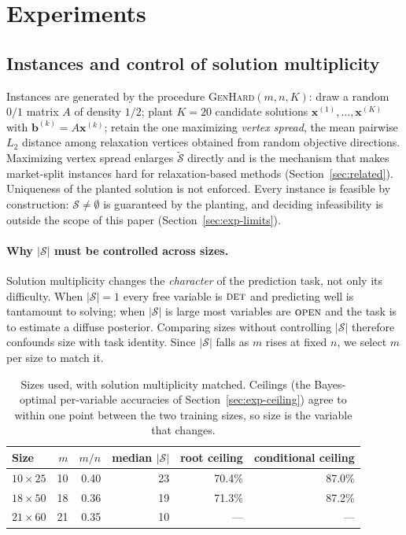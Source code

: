 \documentclass[preprint,12pt]{elsarticle}
\newcommand{\SOL}{\mathcal{S}}
\newcommand{\FORCED}{\textsc{det}}
\newcommand{\FREE}{\textsc{open}}
\begin{document}
\section{Experiments}
\label{sec:exp}

\subsection{Instances and control of solution multiplicity}
\label{sec:exp-instances}

Instances are generated by the procedure \textsc{GenHard}$(m,n,K)$: draw a random $0/1$ matrix $A$ of density $1/2$; plant $K=20$ candidate solutions $\mathbf{x}^{(1)},\dots,\mathbf{x}^{(K)}$ with $\mathbf{b}^{(k)}=A\mathbf{x}^{(k)}$; retain the one maximizing \emph{vertex spread}, the mean pairwise $L_2$ distance among relaxation vertices obtained from random objective directions. Maximizing vertex spread enlarges $\tilde{\SOL}$ directly and is the mechanism that makes market-split instances hard for relaxation-based methods (Section~\ref{sec:related}). Uniqueness of the planted solution is not enforced. Every instance is feasible by construction: $\SOL\neq\emptyset$ is guaranteed by the planting, and deciding infeasibility is outside the scope of this paper (Section~\ref{sec:exp-limits}).

\paragraph{Why $|\SOL|$ must be controlled across sizes.} Solution multiplicity changes the \emph{character} of the prediction task, not only its difficulty. When $|\SOL|=1$ every free variable is $\FORCED$ and predicting well is tantamount to solving; when $|\SOL|$ is large most variables are $\FREE$ and the task is to estimate a diffuse posterior. Comparing sizes without controlling $|\SOL|$ therefore confounds size with task identity. Since $|\SOL|$ falls as $m$ rises at fixed $n$, we select $m$ per size to match it.

\begin{table}[h]
\centering
\begin{tabular}{lrrrrr}
\toprule
Size & $m$ & $m/n$ & median $|\SOL|$ & root ceiling & conditional ceiling \\
\midrule
$10\times25$ & 10 & 0.40 & 23 & 70.4\% & 87.0\% \\
$18\times50$ & 18 & 0.36 & 19 & 71.3\% & 87.2\% \\
$21\times60$ & 21 & 0.35 & 10 & --- & --- \\
\bottomrule
\end{tabular}
\caption{Sizes used, with solution multiplicity matched. Ceilings (the Bayes-optimal per-variable accuracies of Section~\ref{sec:exp-ceiling}) agree to within one point between the two training sizes, so size is the variable that changes.}
\label{tab:sizes}
\end{table}
\end{document}
